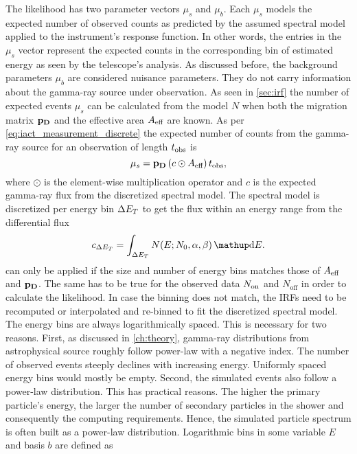 The likelihood has two parameter vectors $\mu_s$ and $\mu_b$. Each $\mu_s$ models the expected number of observed counts as predicted by the assumed 
spectral model applied to the instrument's response function.
In other words, the entries in the $\mu_s$ vector represent the expected counts in the corresponding bin of estimated energy as seen by the telescope's analysis.
As discussed before, the background parameters $\mu_b$ are considered nuisance parameters. They do not carry information about 
the gamma-ray source under observation.
As seen in \cref{sec:irf} the number of expected events $\mu_s$ can be calculated from the model $N$ when both the migration matrix $\mathbf{p_D}$ and the effective area 
$A_\text{eff}$ are known. As per \cref{eq:iact_measurement_discrete} the expected number of counts from the gamma-ray source for an observation of length $t_{\text{obs}}$ is
\begin{equation}
  \label{eq:mu_s_calc}
  \mu_s =  \mathbf{p_D} \, (c \odot A_\text{eff}) \, t_{\text{obs}},
\end{equation}
where $\odot$ is the element-wise multiplication operator and $c$ is the expected gamma-ray flux from the discretized spectral model.
The spectral model is discretized per energy bin $\Delta E_T$ to get the flux within an energy range from the differential flux
\begin{equation}
  \label{eq:spectrum_discrete}
  c_{\Delta \etrue} = \int_{\Delta \etrue} N(E; N_0, \alpha, \beta) \diff{E}.
\end{equation}
 can only be applied if the size and number of energy bins matches those of $A_\text{eff}$ and $\mathbf{p_D}$. 
The same has to be true for the observed data $N_\text{on}$ and $N_\text{off}$ in order to calculate the likelihood.
In case the binning does not match, the IRFs need to be recomputed or interpolated and re-binned 
to fit the discretized spectral model. 
The energy bins are always logarithmically spaced. This is necessary for two reasons. 
First, as discussed in \cref{ch:theory}, gamma-ray distributions from astrophysical source roughly follow power-law with a negative index.  
The number of observed events steeply declines with increasing energy. Uniformly spaced energy bins would mostly be empty.
Second, the simulated events also follow a power-law distribution. This has practical reasons. The higher the primary particle's energy, 
the larger the number of secondary particles in the shower and consequently the computing requirements. Hence, the simulated particle spectrum 
is often built as a power-law distribution. 
Logarithmic bins in some variable $E$ and basis $b$ are defined as 
